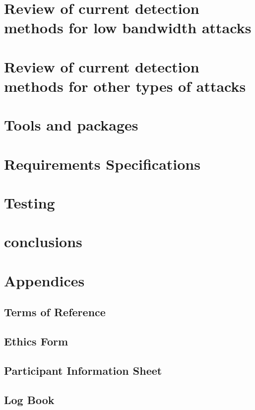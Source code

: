 \documentclass[11pt,twoside]{book}
\begin{document}
\frontmatter




\tableofcontents

\mainmatter

\part{Review of current detection methods for low bandwidth attacks}




\part{Review of current detection methods for other types of attacks}



\part{Tools and packages}
\part{Requirements Specifications}
\part{Testing}
\part{conclusions}
\printbibliography


\part{Appendices}
\appendix
\chapter{Terms of Reference}
\chapter{Ethics Form}

\chapter{Participant Information Sheet}


\chapter{Log Book}

\end{document}
